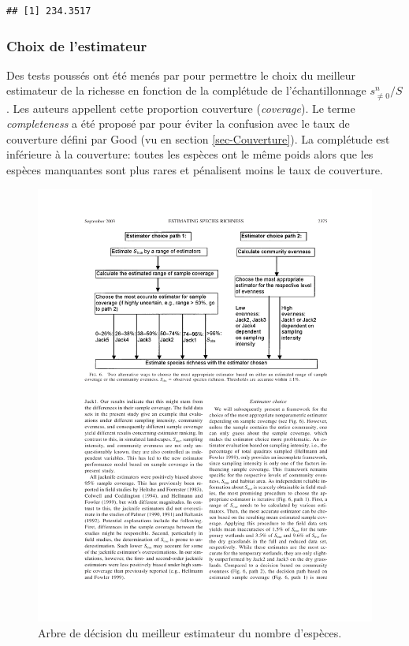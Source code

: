 \documentclass[
  11pt,
  french,
  a4paper,
  extrafontsizes,onecolumn,openright
  ]{memoir}
\begin{document}
\begin{verbatim}
## [1] 234.3517
\end{verbatim}

\normalsize

\subsubsection{Choix de l'estimateur}\label{sec-ChoixEstimateur}

Des tests poussés ont été menés par \textcite{Brose2003} pour permettre le choix du meilleur estimateur de la richesse en fonction de la complétude de l'échantillonnage \(s^{n}_{\ne 0}/{S}\).
Les auteurs appellent cette proportion couverture (\emph{coverage}).
Le terme \emph{completeness} a été proposé par \textcite{Beck2010} pour éviter la confusion avec le taux de couverture défini par Good (vu en section \ref{sec-Couverture}).
La complétude est inférieure à la couverture: toutes les espèces ont le même poids alors que les espèces manquantes sont plus rares et pénalisent moins le taux de couverture.



\scriptsize

\begin{figure}

{\centering \includegraphics[width=0.8\linewidth]{images/Brose2003} 

}

\caption{Arbre de décision du meilleur estimateur du nombre d'espèces.}\label{fig:Brose2003}
\end{figure}
\end{document}
